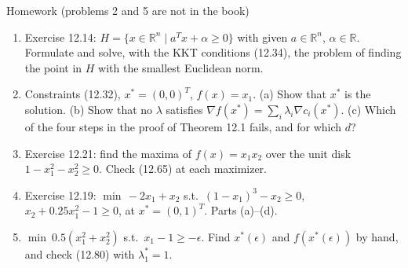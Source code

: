 \documentclass[aspectratio=169,12pt]{beamer}
\newcommand{\R}{\mathbb{R}}
\newcommand{\xs}{x^{*}}
\newcommand{\gradf}{\nabla f}
\newcommand{\ls}{\lambda^{*}}
\begin{document}
\begin{frame}{Homework {\normalfont\small(problems 2 and 5 are not in the book)}}
  \begin{enumerate}\setlength\itemsep{0.45em}
    \item Exercise 12.14: $H=\{x\in\R^{n}\mid a^{T}x+\alpha\ge 0\}$ with given $a\in\R^{n}$, $\alpha\in\R$.
      Formulate and solve, with the KKT conditions (12.34), the problem of finding the point in $H$
      with the smallest Euclidean norm.
    \item Constraints (12.32), $\xs=(0,0)^{T}$, $f(x)=x_{1}$. (a) Show that $\xs$ is the solution.
      (b) Show that no $\lambda$ satisfies $\gradf(\xs)=\sum_{i}\lambda_{i}\nabla c_{i}(\xs)$. (c) Which of the four steps in the proof of
      Theorem 12.1 fails, and for which $d$?
    \item Exercise 12.21: find the maxima of $f(x)=x_{1}x_{2}$ over the unit disk
      $1-x_{1}^{2}-x_{2}^{2}\ge 0$. Check (12.65) at each maximizer.
    \item Exercise 12.19: $\min\,-2x_{1}+x_{2}$ s.t.\ $(1-x_{1})^{3}-x_{2}\ge 0$,
      $x_{2}+0.25x_{1}^{2}-1\ge 0$, at $\xs=(0,1)^{T}$. Parts (a)--(d).
    \item $\min\ 0.5(x_{1}^{2}+x_{2}^{2})$ s.t.\ $x_{1}-1\ge-\epsilon$. Find $\xs(\epsilon)$ and
      $f(\xs(\epsilon))$ by hand, and check (12.80) with $\ls_{1}=1$.
  \end{enumerate}
\end{frame}
\end{document}
